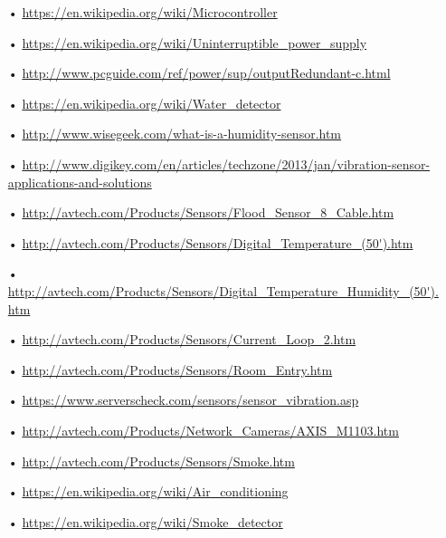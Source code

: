\begin{enumerate}
	\item[•] \url{https://en.wikipedia.org/wiki/Microcontroller}
	\item[•] \url{https://en.wikipedia.org/wiki/Uninterruptible_power_supply}
	\item[•] \url{http://www.pcguide.com/ref/power/sup/outputRedundant-c.html}
	\item[•] \url{https://en.wikipedia.org/wiki/Water_detector}
	\item[•] \url{http://www.wisegeek.com/what-is-a-humidity-sensor.htm}
	\item[•] \url{http://www.digikey.com/en/articles/techzone/2013/jan/vibration-sensor-applications-and-solutions}
	\item[•] \url{http://avtech.com/Products/Sensors/Flood_Sensor_8_Cable.htm}
	\item[•] \url{http://avtech.com/Products/Sensors/Digital_Temperature_(50').htm}
	\item[•] \url{http://avtech.com/Products/Sensors/Digital_Temperature_Humidity_(50').htm}
	\item[•] \url{http://avtech.com/Products/Sensors/Current_Loop_2.htm}
	\item[•] \url{http://avtech.com/Products/Sensors/Room_Entry.htm}
	\item[•] \url{https://www.serverscheck.com/sensors/sensor_vibration.asp}
	\item[•] \url{http://avtech.com/Products/Network_Cameras/AXIS_M1103.htm}
	\item[•] \url{http://avtech.com/Products/Sensors/Smoke.htm}
	\item[•] \url{https://en.wikipedia.org/wiki/Air_conditioning}
	\item[•] \url{https://en.wikipedia.org/wiki/Smoke_detector}
\end{enumerate}